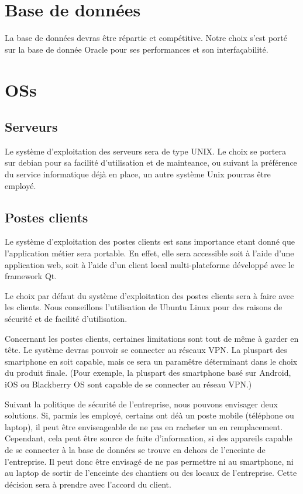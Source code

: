 \section{Base de données}
    La base de données devras être répartie et compétitive.
    Notre choix s'est porté sur la base de donnée Oracle pour ses performances et son interfaçabilité.

\section{OSs}
    \subsection{Serveurs}
        Le système d'exploitation des serveurs sera de type UNIX.
        Le choix se portera sur debian pour sa facilité d'utilisation et de mainteance, ou suivant la préférence du service informatique déjà en place, un autre système Unix pourras être employé.
    \subsection{Postes clients}
        Le système d'exploitation des postes clients est sans importance etant donné que l'application métier sera portable.
        En effet, elle sera accessible soit à l'aide d'une application web, soit à l'aide d'un client local multi-plateforme développé avec le framework Qt.

        Le choix par défaut du système d'exploitation des postes clients sera à faire avec les clients.
        Nous conseillons l'utilisation de Ubuntu Linux pour des raisons de sécurité et de facilité d'utilisation.

        Concernant les postes clients, certaines limitations sont tout de même à garder en tête.
        Le système devras pouvoir se connecter au réseaux VPN.
        La pluspart des smartphone en soit capable, mais ce sera un paramêtre déterminant dans le choix du produit finale.
        (Pour exemple, la pluspart des smartphone basé sur Android, iOS ou Blackberry OS sont capable de se connecter au réseau VPN.)

        Suivant la politique de sécurité de l'entreprise, nous pouvons envisager deux solutions.
        Si, parmis les employé, certains ont déà un poste mobile (téléphone ou laptop), il peut être enviseageable de ne pas en racheter un en remplacement. Cependant, cela peut être source de fuite d'information, si des appareils capable de se connecter à la base de données se trouve en dehors de l'enceinte de l'entreprise.
        Il peut donc être envisagé de ne pas permettre ni au smartphone, ni au laptop de sortir de l'enceinte des chantiers ou des locaux de l'entreprise.
        Cette décision sera à prendre avec l'accord du client.
